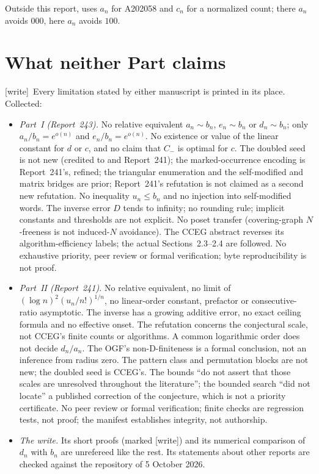 \documentclass[11pt,letterpaper]{article}
\theoremstyle{remark}\newtheorem{remark}[theorem]{Remark}
\newcommand{\wtag}{\textup{[write]}}
\theoremstyle{remark}\newtheorem{wremark}{Remark}\renewcommand{\thewremark}{W\arabic{wremark}}
\theoremstyle{plain}\newtheorem{wcorollary}[wremark]{Corollary}
\begin{document}
Outside this report,  uses $a_n$ for
A202058 and $c_n$ for a normalized count; there $a_n$ avoids $000$, here
$a_n$ avoids $100$.

\section{What neither Part claims}\label{a59:sec:limits}

\wtag\ Every limitation stated by either manuscript is printed in its
place. Collected:
\begin{itemize}
\item \emph{Part~I (Report~243).} No relative equivalent $a_n\sim b_n$,
$e_n\sim b_n$ or $d_n\sim b_n$; only $a_n/b_n=e^{o(n)}$ and
$e_n/b_n=e^{o(n)}$. No existence or value of the linear constant for $d$ or
$c$, and no claim that $C_-$ is optimal for $c$. The doubled seed is not new
(credited to \cite[Section~7]{conway} and Report~241); the marked-occurrence
encoding is Report~241's, refined; the triangular enumeration and the
self-modified and matrix bridges are prior; Report~241's refutation is not
claimed as a second new refutation. No inequality $u_n\le b_n$ and no
injection into self-modified words. The inverse error $D$ tends to
infinity; no rounding rule; implicit constants and thresholds are not
explicit. No poset transfer (covering-graph $N$-freeness is not induced-$N$
avoidance). The CCEG abstract reverses its algorithm-efficiency labels; the
actual Sections~2.3--2.4 are followed. No exhaustive priority, peer review
or formal verification; byte reproducibility is not proof.
\item \emph{Part~II (Report~241).} No relative equivalent, no limit of
$(\log n)^2(u_n/n!)^{1/n}$, no linear-order constant, prefactor or
consecutive-ratio asymptotic. The inverse has a growing additive error, no
exact ceiling formula and no effective onset. The refutation concerns the
conjectural scale, not CCEG's finite counts or algorithms. A common
logarithmic order does not decide $d_n/a_n$. The OGF's non-D-finiteness is
a formal conclusion, not an inference from radius zero. The pattern class
and permutation blocks are not new; the doubled seed is CCEG's. The bounds
``do not assert that those scales are unresolved throughout the
literature''; the bounded search ``did not locate'' a published correction
of the conjecture, which is not a priority certificate. No peer review or
formal verification; finite checks are regression tests, not proof; the
manifest establishes integrity, not authorship.
\item \emph{The write.} Its short proofs (marked \wtag) and its numerical
comparison of $d_n$ with $b_n$ are unrefereed like the rest. Its statements
about other reports are checked against the repository of 5 October 2026.
\end{itemize}
\end{document}
